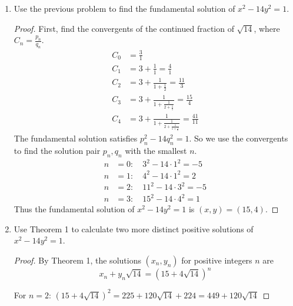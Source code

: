 \documentclass[11pt]{article}
\theoremstyle{definition}
\begin{document}
\begin{enumerate}
\begin{enumerate}
\begin{proof}
            Thus, 
            \[
                \sqrt{14} = 3 + \frac{1}{1 + \frac{1}{2 + \frac{1}{1 + \frac{1}{6 + \frac{1}{1 + \dots}}}}} = [3;\overline{1,2,1,6}]
            \]
        \end{proof}
        
        \item Use the previous problem to find the fundamental solution of $x^2-14 y^2 = 1$.
        \begin{proof}
            First, find the convergents of the continued fraction of $\sqrt{14}$, 
            where $C_n = \frac{p_n}{q_n}$.
            \begin{align*}
                C_0 &= \frac{3}{1} \\
                C_1 &= 3 + \frac{1}{1} = \frac{4}{1} \\
                C_2 &= 3 + \frac{1}{1 + \frac{1}{2}} = \frac{11}{3} \\
                C_3 &= 3 + \frac{1}{1 + \frac{1}{2 + \frac{1}{1}}} = \frac{15}{4} \\
                C_4 &= 3 + \frac{1}{1 + \frac{1}{2 + \frac{1}{1 + \frac{1}{6}}}} = \frac{41}{11} 
            \end{align*}
            The fundamental solution satisfies $p_n^2-14q_n^2 = 1$. So we use the convergents to find the solution pair $p_n, q_n$ with the smallest $n$. 
            \begin{align*}
                n&=0: \quad 3^2 - 14\cdot 1^2 = -5 \\
                n&=1: \quad 4^2 - 14\cdot 1^2 = 2 \\
                n&=2: \quad 11^2 - 14\cdot 3^2 = -5 \\
                n&=3: \quad 15^2 - 14\cdot 4^2 = 1
            \end{align*}
            Thus the fundamental solution of $x^2 - 14y^2 = 1$ is $(x,y) = (15,4)$.
        \end{proof}
        
        \item Use Theorem 1 to calculate two more distinct positive solutions of $x^2-14 y^2 = 1$.
        \begin{proof}
            By Theorem 1, the solutions $(x_n, y_n)$
            for positive integers $n$ are 
            \[
                x_n + y_n\sqrt{14} = (15 + 4\sqrt{14})^n
            \]

            For $n=2$: 
            $(15+4\sqrt{14})^2 = 225 + 120\sqrt{14} + 224 = 449 + 120\sqrt{14}$
            

\end{proof}
\end{enumerate}
\end{enumerate}
\end{document}
